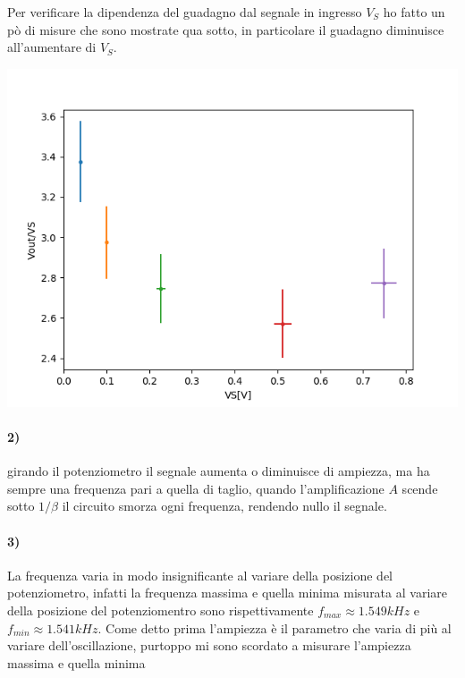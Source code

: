 \documentclass{article}
\begin{document}
	Per verificare la dipendenza del guadagno dal segnale in ingresso $V_S$ ho fatto un pò di misure che sono mostrate qua sotto, in particolare il guadagno diminuisce all'aumentare di $V_S$.\newline
	\begin{minipage}{.4\linewidth}
        \centering
        \includegraphics[width=\linewidth]{figure/1b.png}
    \end{minipage}
    \begin{minipage}{.5\linewidth}
        
        \label{tab:124}
    \end{minipage}
\paragraph{2)}
	girando il potenziometro il segnale aumenta o diminuisce di ampiezza, ma ha sempre una frequenza pari a quella di taglio, quando l'amplificazione $A$ scende sotto $1/\beta$ il circuito smorza ogni frequenza, rendendo nullo il segnale.
\paragraph{3)}
	La frequenza varia in modo insignificante al variare della posizione del potenziometro, infatti la frequenza massima e quella minima misurata al variare della posizione del potenziomentro sono rispettivamente $f_{max}\approx1.549 kHz$ e $f_{min}\approx1.541 kHz$.\newline
	Come detto prima l'ampiezza è il parametro che varia di più al variare dell'oscillazione, purtoppo mi sono scordato a misurare l'ampiezza massima e quella minima
\end{document}
